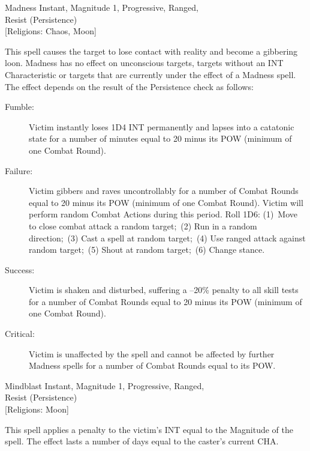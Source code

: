 \begin{rpg-spell}
{Madness}
{Instant, Magnitude 1, Progressive, Ranged,\\Resist (Persistence)\\{[Religions: Chaos, Moon]}}

This spell causes the target to lose contact with reality and become a gibbering loon. Madness has no effect on unconscious targets, targets without an INT Characteristic or targets that are currently under the effect of a Madness spell. The effect depends on the result of the Persistence check as follows:
\begin{description}
\item[Fumble:] Victim instantly loses 1D4 INT permanently and lapses into a catatonic state for a number of minutes equal to 20 minus its POW (minimum of one Combat Round). 
\item[Failure:] Victim gibbers and raves uncontrollably for a number of Combat Rounds equal to 20 minus its POW (minimum of one Combat Round). Victim will perform random Combat Actions during this period. Roll 1D6: (1) Move to close combat attack a random target; (2) Run in a random direction; (3) Cast a spell at random target; (4) Use ranged attack against random target; (5) Shout at random target; (6) Change stance. 
\item[Success:] Victim is shaken and disturbed, suffering a –20\% penalty to all skill tests for a number of Combat Rounds equal to 20 minus its POW (minimum of one Combat Round).
\item[Critical:] Victim is unaffected by the spell and cannot be affected by further Madness spells for a number of Combat Rounds equal to its POW.
\end{description}

\end{rpg-spell}

\begin{rpg-spell}
{Mindblast}
{Instant, Magnitude 1, Progressive, Ranged,\\Resist (Persistence)\\{[Religions: Moon]}}

This spell applies a penalty to the victim’s INT equal to the Magnitude of the spell. The effect lasts a number of days equal to the caster’s current CHA. 
\end{rpg-spell}

